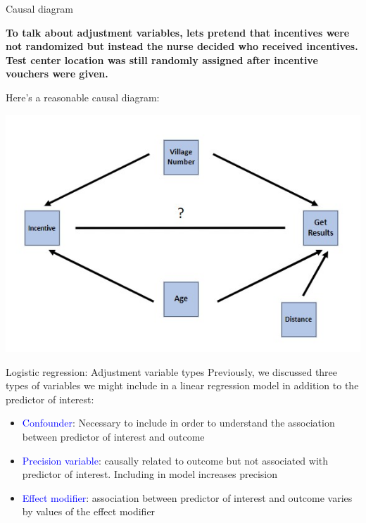 \documentclass[10pt,t]{beamer}
\begin{document}
\begin{frame}{Causal diagram}
	\vspace{-5mm}
		
	\textbf{To talk about adjustment variables, lets pretend that incentives were not randomized but instead the nurse decided who received incentives. Test center location was still randomly assigned after incentive vouchers were given.}
	
\medskip
	
	Here's a reasonable causal diagram:
	\begin{center}
		\includegraphics[scale = 0.55]{./figs/HIV_dag}
	\end{center}
	
\end{frame}


\begin{frame}{Logistic regression: Adjustment variable types}
	Previously, we discussed three types of variables we might include in a linear regression model in addition to the predictor of interest:
	\medskip
	\begin{itemize}
		\item \textcolor{blue}{Confounder}: Necessary to include in order to understand the association between predictor of interest and outcome
		
		
		\medskip
		
		\item \textcolor{blue}{Precision variable}: causally related to outcome but not associated with predictor of interest. Including in model increases precision
		
		\medskip
		
		\item \textcolor{blue}{Effect modifier}: association between predictor of interest and outcome varies by values of the effect modifier 
	\end{itemize}
\end{frame}
\end{document}
